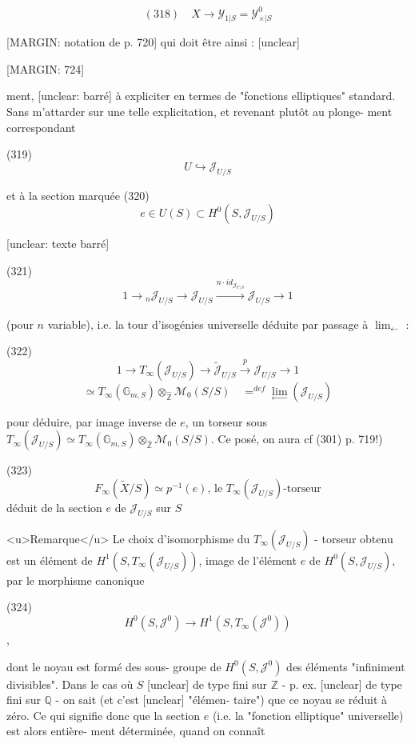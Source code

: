 $$ (318) \quad X \longrightarrow \mathcal{Y}_{1|S} = \mathcal{Y}^0_{\times|S} $$

[MARGIN: notation de p. 720]
qui doit être ainsi : [unclear]

\newpage


[MARGIN: 724]

ment, [unclear: barré] à expliciter en termes
de "fonctions elliptiques" standard.
Sans m'attarder sur une telle
explicitation, et revenant plutôt au plonge-
ment correspondant

(319) $$U \hookrightarrow \mathcal{J}_{U/S}$$

et à la section marquée
(320) $$e \in U(S) \subset H^0(S, \mathcal{J}_{U/S})$$

[unclear: texte barré]

(321) $$1 \to {}_n\mathcal{J}_{U/S} \longrightarrow \mathcal{J}_{U/S} \stackrel{n \cdot id_{\mathcal{J}_{U/S}}}{\longrightarrow} \mathcal{J}_{U/S} \to 1$$

(pour $n$ variable), i.e. la tour d'isogénies
universelle déduite par passage à $\lim_{\leftarrow}$ :

(322) $$1 \to T_\infty(\mathcal{J}_{U/S}) \longrightarrow \tilde{\mathcal{J}}_{U/S} \stackrel{p}{\longrightarrow} \mathcal{J}_{U/S} \to 1$$
$$ \simeq T_\infty(\mathbb{G}_{m,S}) \otimes_{\hat{\mathbb{Z}}} \mathcal{M}_0(S/S) \quad =^{def} \lim_{\leftarrow} (\mathcal{J}_{U/S}) $$

pour déduire, par image inverse de $e$,
un torseur sous $T_\infty(\mathcal{J}_{U/S}) \simeq T_\infty(\mathbb{G}_{m,S}) \otimes_{\hat{\mathbb{Z}}} \mathcal{M}_0(S/S)$.
Ce posé, on aura cf (301) p. 719!)

(323) $$F_\infty(\tilde{X}/S) \simeq p^{-1}(e) \text{, le } T_\infty(\mathcal{J}_{U/S})\text{-torseur}$$
déduit de la section $e$
de $\mathcal{J}_{U/S}$ sur $S$

\newpage


<u>Remarque</u> Le choix d'isomorphisme du
$T_\infty(\mathcal{J}_{U/S})$ - torseur obtenu est un
élément de $H^1(S, T_\infty(\mathcal{J}_{U/S}))$, image
de l'élément $e$ de $H^0(S, \mathcal{J}_{U/S})$, par
le morphisme canonique

(324) $$H^0(S, \mathcal{J}^0) \longrightarrow H^1(S, T_\infty(\mathcal{J}^0))$$ ,

dont le noyau est formé des sous-
groupe de $H^0(S, \mathcal{J}^0)$ des éléments
"infiniment divisibles". Dans le
cas où $S$ [unclear] de type fini sur $\mathbb{Z}$
- p. ex. [unclear] de type fini sur $\mathbb{Q}$ -
on sait (et c'est [unclear] "élémen-
taire") que ce noyau se réduit
à zéro. Ce qui signifie donc que
la section $e$ (i.e. la "fonction
elliptique" universelle) est alors entière-
ment déterminée, quand on connaît


